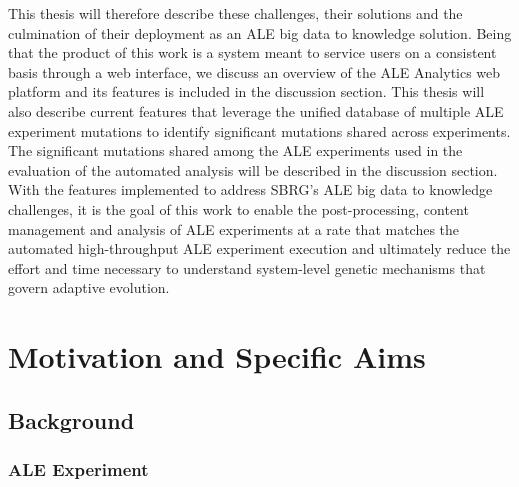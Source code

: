\documentclass[12pt,final,masters,chapterheads]{ucsd}  %
\begin{document}
This thesis will therefore describe these challenges, their solutions and the culmination of their deployment as an ALE big data to knowledge solution. Being that the product of this work is a system meant to service users on a consistent basis through a web interface, we discuss an overview of the ALE Analytics web platform and its features is included in the discussion section. This thesis will also describe current features that leverage the unified database of multiple ALE experiment mutations to identify significant mutations shared across experiments. The significant mutations shared among the ALE experiments used in the evaluation of the automated analysis will be described in the discussion section. With the features implemented to address SBRG's ALE big data to knowledge challenges, it is the goal of this work to enable the post-processing, content management and analysis of ALE experiments at a rate that matches the automated high-throughput ALE experiment execution and ultimately reduce the effort and time necessary to understand system-level genetic mechanisms that govern adaptive evolution.
\chapter{Motivation and Specific Aims}
%
%
%
%
%
%
%
%
\section{Background}
\subsection{ALE Experiment}
%
%
\end{document}
